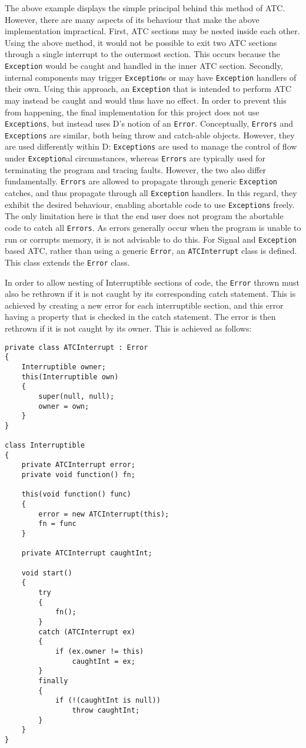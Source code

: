 The above example displays the simple principal behind this method of ATC.
However, there are many aspects of its behaviour that make the above
implementation impractical. 
First, ATC sections may be nested inside each other. Using the above 
method, it would not be possible to exit two ATC sections through a single interrupt
to the outermost section. This occurs because the \texttt{Exception} would be caught and
handled in the inner ATC section. 
Secondly, internal components may trigger \texttt{Exception}s or may have \texttt{Exception} handlers 
of their own. Using this approach, an \texttt{Exception} that is intended to perform ATC 
may instead be caught and would thus have no effect. 
In order to prevent this from happening, the final implementation for this
project does not use \texttt{Exceptions}, but instead uses D's notion of an
\texttt{Error}. Conceptually, \texttt{Errors} and \texttt{Exceptions} are
similar, both being throw and catch-able objects. 
However, they are used differently within D: \texttt{Exceptions} are used to
manage the control of flow under \texttt{Exception}al circumstances, whereas
\texttt{Errors} are typically used for terminating the program and tracing faults. 
However, the two also differ fundamentally. 
\texttt{Errors} are allowed to propagate through generic \texttt{Exception} catches, and thus propagate 
through all \texttt{Exception} handlers. In this regard, they exhibit the desired
behaviour, enabling abortable code to use \texttt{Exceptions} freely. The only
limitation here is that the end user does not program the
abortable code to catch all \texttt{Errors}. As errors generally occur when the
program is unable to run or corrupts memory, it is not advisable to do this. 
For Signal and \texttt{Exception} based ATC, rather than using a generic
\texttt{Error}, an \texttt{ATCInterrupt} class is defined. 
This class extends the \texttt{Error} class.
\par\bigskip\noindent
In order to allow nesting of Interruptible sections of code, the \texttt{Error} thrown
must also be rethrown if it is not caught by its corresponding catch statement. 
This is achieved by creating a new error for each interruptible section, and
this error having a property that is checked in the catch statement. The error
is then rethrown if it is not caught by its owner. 
This is achieved as follows: 
\begin{lstlisting}
private class ATCInterrupt : Error
{
    Interruptible owner;
    this(Interruptible own)
    {
        super(null, null);
        owner = own;
    }
}

class Interruptible
{
    private ATCInterrupt error; 
    private void function() fn; 

    this(void function() func)
    {
        error = new ATCInterrupt(this); 
        fn = func
    }

    private ATCInterrupt caughtInt;

    void start()
    {
        try
        {
            fn();
        }
        catch (ATCInterrupt ex)
        {
            if (ex.owner != this)
                caughtInt = ex;
        }
        finally
        {
            if (!(caughtInt is null))
                throw caughtInt;
        }
    }
}
\end{lstlisting}
